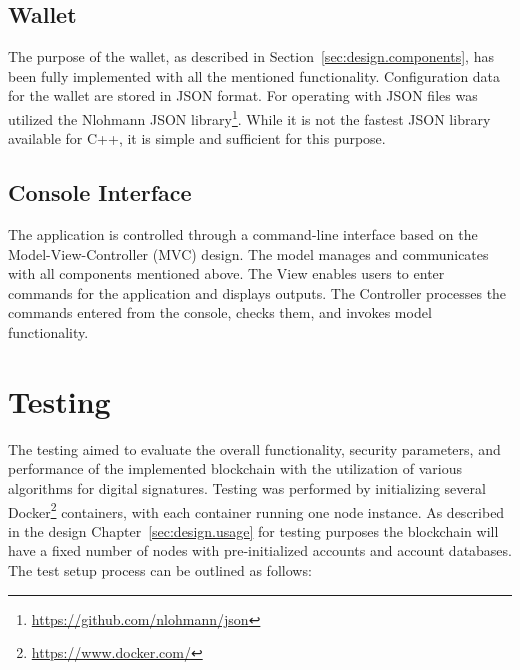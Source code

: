
\section{Wallet}

The purpose of the wallet, as described in Section~\ref{sec:design.components}, has been fully implemented with all the mentioned functionality. Configuration data for the wallet are stored in JSON format. For operating with JSON files was utilized the Nlohmann JSON library\footnote{\url{https://github.com/nlohmann/json}}. While it is not the fastest JSON library available for C++, it is simple and sufficient for this purpose.


\section{Console Interface}

The application is controlled through a command-line interface based on the Model-View-Controller (MVC) design. The model manages and communicates with all components mentioned above. The View enables users to enter commands for the application and displays outputs. The Controller processes the commands entered from the console, checks them, and invokes model functionality.



\chapter{Testing}
\label{chap:Testing}

The testing aimed to evaluate the overall functionality, security parameters, and performance of the implemented blockchain with the utilization of various algorithms for digital signatures. Testing was performed by initializing several Docker\footnote{\url{https://www.docker.com/}} containers, with each container running one node instance. As described in the design Chapter~\ref{sec:design.usage} for testing purposes the blockchain will have a fixed number of nodes with pre-initialized accounts and account databases. The test setup process can be outlined as follows:


